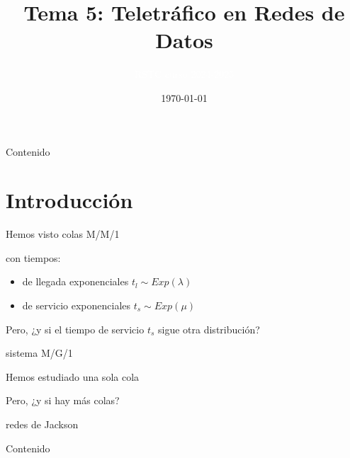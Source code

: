 \documentclass[xcolor={x11names}]{beamer}
\title[Tema 5]{Tema 5: Teletráfico en Redes de Datos}
\author{\textcolor{white}{RSTC curso 2024-2025}}
\date{\today}
\begin{document}
\frame{\titlepage}


\begin{frame}{Contenido}
    \tableofcontents
\end{frame}




\section{Introducción}
\begin{frame}{\secname}
    Hemos visto colas M/M/1
    \begin{figure}
        
    \end{figure}
    con tiempos:
    \begin{itemize}
        \item de llegada exponenciales
            $t_l\sim Exp(\lambda)$
        \item de servicio exponenciales
            $t_s\sim Exp(\mu)$
    \end{itemize}

    \pause
    \vfill

    {\color{blue}
    Pero, ¿y si el tiempo de servicio $t_s$
    sigue otra distribución?
    }
     
    \pause
    \begin{itemize}
        {\color{red}
        \item sistema M/G/1
        }
    \end{itemize}
\end{frame}



\begin{frame}{\secname}
    Hemos estudiado una sola cola
    \begin{figure}
        
    \end{figure}

    \vfill
    {\color{blue}
    Pero, ¿y si hay más colas?
    }
    \pause
    \begin{itemize}
        {\color{red}
        \item redes de Jackson
        }
    \end{itemize}
    \begin{figure}
        
    \end{figure}
\end{frame}


\begin{frame}{Contenido}
    \tableofcontents
\end{frame}
\end{document}

